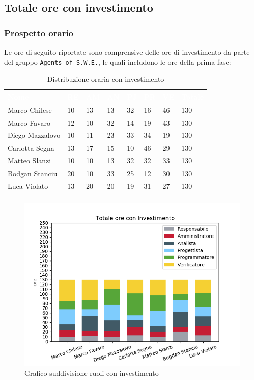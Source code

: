 \newpage
\subsection{Totale ore con investimento}
\label{PTI}
\subsubsection{Prospetto orario}

Le ore di seguito riportate sono comprensive delle ore di investimento da parte del gruppo \texttt{Agents of S.W.E.}, le quali includono le ore della prima fase:

\begin{longtable}{|C{.30\textwidth}|C{.06\textwidth}|C{.06\textwidth}|C{.06\textwidth} | C{.06\textwidth}| C{.06\textwidth} | C{.06\textwidth} | C{.10\textwidth} |}
\hline
{}	\textbf{\textcolor{white}{Nome}} & \textbf{\textcolor{white}{RE}} & \textbf{\textcolor{white}{AM}} & \textbf{\textcolor{white}{AN}} & \textbf{\textcolor{white}{PJ}} & \textbf{\textcolor{white}{PR}} & \textbf{\textcolor{white}{VE}} & \textbf{\textcolor{white}{Totale}}\\
\hline 
Marco Chilese & 10 & 13 & 13 & 32 & 16 & 46 & 130\\
\hline
{}Marco Favaro & 12 & 10 & 32 & 14 & 19 & 43 & 130\\
\hline
Diego Mazzalovo & 10 & 11 & 23 & 33 & 34 & 19 & 130\\
\hline
{}Carlotta Segna & 13 & 17 & 15 & 10 & 46 & 29 & 130\\
\hline
Matteo Slanzi & 10 & 10 & 13 & 32 & 32 & 33 & 130\\
\hline
{}Bodgan Stanciu & 20 & 10 & 33 & 25 & 12 & 30 & 130\\
\hline
Luca Violato & 13 & 20 & 20 & 19 & 31 & 27 & 130 \\
\hline


\caption{Distribuzione oraria con investimento}
\label{Distribuzione oraria delle ore con investimento}
\end{longtable}

\begin{figure}[H]
	\centering
  		\includegraphics[width=0.8\linewidth]{./images/fig_toi.png}
  		\caption{Grafico suddivisione ruoli con investimento}
  		\label{fig:grafico suddivione ruoli con investimento}
\end{figure}

